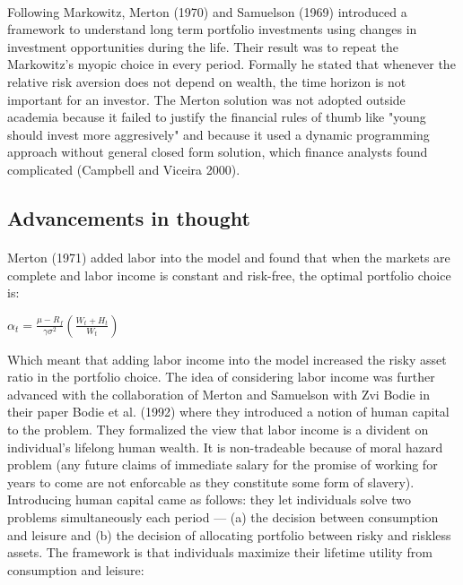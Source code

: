 \documentclass[]{article}
\begin{document}
\paragraph{}Following Markowitz, Merton (1970) and Samuelson (1969) introduced a framework to understand long term portfolio investments using changes in investment opportunities during the life. Their result was to repeat the Markowitz's myopic choice in every period. Formally he stated that whenever the relative risk aversion does not depend on wealth, the time horizon is not important for an investor. The Merton solution was not adopted outside academia because it failed to justify the financial rules of thumb like "young should invest more aggresively" and because it used a dynamic programming approach without general closed form solution, which finance analysts found complicated (Campbell and Viceira 2000).



\subsection{Advancements in thought}

\paragraph*{}Merton (1971) added labor into the model and found that when the markets are complete and labor income is constant and risk-free, the optimal portfolio choice is:

\begin{center}
	$\alpha_t = \frac{\mu - R_f}{\gamma \sigma^2}(\frac{W_t + H_t}{W_t})$
\end{center}

Which meant that adding labor income into the model increased the risky asset ratio in the portfolio choice. The idea of considering labor income was further advanced with the collaboration of Merton and Samuelson with Zvi Bodie in their paper Bodie et al. (1992) where they introduced a notion of human capital to the problem. They formalized the view that labor income is a divident on individual's lifelong human wealth. It is non-tradeable because of moral hazard problem (any future claims of immediate salary for the promise of working for years to come are not enforcable as they constitute some form of slavery). Introducing human capital came as follows: they let individuals solve two problems simultaneously each period --- (a) the decision between consumption and leisure and (b) the decision of allocating portfolio between risky and riskless assets. The framework is that individuals maximize their lifetime utility from consumption and leisure:
\end{document}
